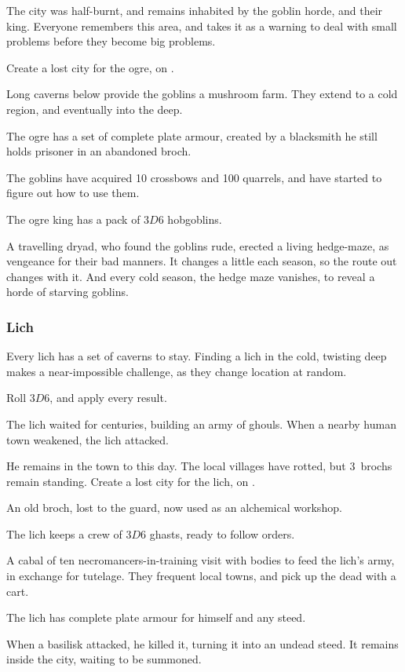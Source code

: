 \begin{multicols}{2}
\begin{dlist}
  The city was half-burnt, and remains inhabited by the goblin horde, and their king.
  Everyone remembers this area, and takes it as a warning to deal with small problems before they become big problems.

  Create a lost city for the ogre, on .
  \item
  Long caverns below provide the goblins a mushroom farm.
  They extend to a cold region, and eventually into the \gls{deep}.
  \item
  The ogre has a set of complete plate armour, created by a blacksmith he still holds prisoner in an abandoned \gls{broch}.
  \item
  The goblins have acquired 10 crossbows and 100 quarrels, and have started to figure out how to use them.
  \item
  The ogre king has a pack of $3D6$ hobgoblins.
  \item
  A travelling dryad, who found the goblins rude, erected a living hedge-maze, as vengeance for their bad manners.
  It changes a little each season, so the route out changes with it.
  And every cold season, the hedge maze vanishes, to reveal a horde of starving goblins.
\end{dlist}

\subsubsection{Lich}
\label{lichPoint}

Every lich has a set of caverns to stay.
Finding a lich in the cold, twisting \gls{deep} makes a near-impossible challenge, as they change location at random.

Roll $3D6$, and apply every result.

\begin{dlist}
  \item
  The lich waited for centuries, building an army of ghouls.
  When a nearby human town weakened, the lich attacked.

  He remains in the town to this day.
  The local \glspl{village} have rotted, but 3~\glspl{broch} remain standing.
  Create a lost city for the lich, on .
  \item
  An old \gls{broch}, lost to the \gls{guard}, now used as an alchemical workshop.
  \item
  The lich keeps a crew of $3D6$ ghasts, ready to follow orders.
  \item
  A cabal of ten necromancers-in-training visit with bodies to feed the lich's army, in exchange for tutelage.
  They frequent local towns, and pick up the dead with a cart.
  \item
  The lich has complete plate armour for himself and any steed.
  \item
  When a basilisk attacked, he killed it, turning it into an undead steed.
  It remains inside the city, waiting to be summoned.
\end{dlist}

\end{multicols}

